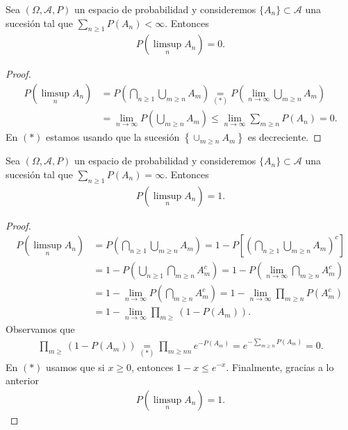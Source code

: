 \begin{teo}
    Sea $(\Omega,\mathcal{A},P)$ un espacio de probabilidad y consideremos $\{A_n\} \subset \mathcal{A}$ una sucesión tal que $\sum_{n \ge 1} P(A_n) < \infty$. Entonces
    \begin{align*}
        P\left( \limsup_n A_n \right) = 0.
    \end{align*}
\end{teo}

\begin{proof}
    \begin{align*}
        P\left( \limsup_n A_n \right) & = P \left( \bigcap_{n \ge 1} \bigcup_{m \ge n} A_m \right) \underset{(*)}{=} P \left( \lim_{n \to \infty} \bigcup_{m \ge n} A_m \right) \\
                                      & = \lim_{n \to \infty} P \left( \bigcup_{m \ge n} A_m \right) \leq \lim_{n \to \infty} \sum_{m \ge n} P(A_n) = 0.
    \end{align*}
    En $(*)$ estamos usando que la sucesión $\left\{ \cup_{m \ge n} A_m \right\}$ es decreciente.
\end{proof}

\begin{teo}
    Sea $(\Omega,\mathcal{A},P)$ un espacio de probabilidad y consideremos $\{A_n\} \subset \mathcal{A}$ una sucesión tal que $\sum_{n \ge 1} P(A_n) = \infty$. Entonces
    \begin{align*}
        P\left( \limsup_n A_n \right) = 1.
    \end{align*}
\end{teo}

\begin{proof}
    \begin{align*}
        P\left( \limsup_n A_n \right) & = P \left( \bigcap_{n \ge 1} \bigcup_{m \ge n} A_m \right) = 1 - P\left[ \left( \bigcap_{n \ge 1} \bigcup_{m \ge n} A_m \right)^c \right] \\
                                      & = 1 - P\left(\bigcup_{n \ge 1} \bigcap_{m \ge n} A_m^c\right) = 1 - P\left(\lim_{n \to \infty} \bigcap_{m \ge n} A_m^c\right)             \\
                                      & = 1 - \lim_{n \to \infty } P\left( \bigcap_{m \ge n} A_m^c\right) = 1 - \lim_{n \to \infty} \prod_{m \ge n} P(A_m^c)                      \\
                                      & = 1 - \lim_{n \to \infty} \prod_{m \ge} (1 - P(A_m)).
    \end{align*}
    Observamos que
    \begin{align*}
        \prod_{m \ge} (1 - P(A_m)) \underset{(*)}{=} \prod_{m \ge nn} e^{-P(A_m)}= e^{-\sum_{m \ge n}P(A_m)} = 0.
    \end{align*}
    En $(*)$ usamos que si $x \ge 0$, entonces $1 - x \leq e^{-x}$. Finalmente, gracias a lo anterior
    \begin{align*}
        P\left( \limsup_n A_n \right) = 1.
    \end{align*}
\end{proof}

